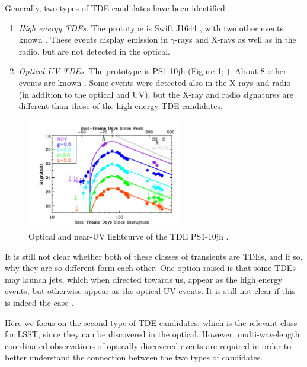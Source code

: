 Generally, two types of TDE candidates have been identified:
\begin{enumerate}
	\item \textit{High energy TDEs}. The prototype is Swift J1644
\citep{Bloom2011, Burrows2011, Levan2011, Zauderer2011}, with two other
events known \citep{Cenko2012, Brown2015}. These events display emission
in $\gamma$-rays and X-rays as well as in the radio, but are not
detected in the optical.
\item \textit{Optical-UV TDEs}.  The prototype is PS1-10jh
(Figure \ref{fig:tde}; \citealp{Gezari2012}).
		About $8$ other events are known
\citep{Chornock2014, Arcavi2014, Holoien2014, Holoien2015, Holoien2016}.
Some events were detected also in the X-rays and radio (in addition to
the optical and UV), but the X-ray and radio signatures are different
than those of the high energy TDE candidates.
\end{enumerate}

\begin{figure}[hbt]
\centerline{
\includegraphics[width=0.6\textwidth]{figs/transients/tdeGezari.pdf}
}
\caption{
Optical and near-UV lightcurve of the TDE PS1-10jh \citep{Gezari2012}.
}
\label{fig:tde}
\end{figure}

It is still not clear whether both of these classes of transients are TDEs,
and if so, why they are so different form each other. One option raised is
that some TDEs may launch jets, which when directed towards us, appear as
the high energy events, but otherwise appear as the optical-UV events.
It is still not clear if this is indeed the case \citep[e.g.][]{VanVelzen2013}.

Here we focus on the second type of TDE candidates, which is the
relevant class for LSST, since they can be discovered in the optical.
However, multi-wavelength coordinated observations of
optically-discovered events are required in order to better understand
the connection between the two types of candidates.

